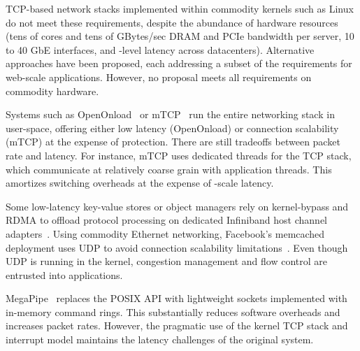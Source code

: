 TCP-based network stacks implemented within commodity kernels such as
Linux do not meet these requirements, despite the abundance of hardware
resources (tens of cores and tens of GBytes/sec DRAM and PCIe
bandwidth per server, 10 to 40 GbE interfaces, and \microsecond-level
latency across datacenters).
Alternative approaches have been proposed, each addressing a subset of
the requirements for web-scale applications. However, no
proposal meets all requirements on commodity hardware. 

 Systems such as
OpenOnload~\cite{openonload} or mTCP~\cite{jeong2014mtcp} run the
entire networking stack in user-space, offering either low latency
(OpenOnload) or connection scalability (mTCP) at the expense of
protection. There are still tradeoffs between packet rate and
latency. For instance, mTCP uses dedicated threads for the TCP
stack, which communicate at relatively coarse grain with application
threads. This amortizes switching overheads at the
expense of \microsecond-scale latency.

 Some low-latency key-value stores or object managers rely on
kernel-bypass and RDMA to offload protocol processing on dedicated
Infiniband host channel
adapters~\cite{DBLP:conf/sosp/OngaroRSOR11,Jose:2011:MDH,mitchell:rdma,dragojevic14farm}.  Using
commodity Ethernet networking, Facebook's memcached deployment uses
UDP to avoid connection scalability
limitations~\cite{nishtala2013scaling}. Even though UDP is running in
the kernel, congestion management and flow control are entrusted into
applications.

 MegaPipe~\cite{han2012megapipe}
replaces the POSIX API with lightweight sockets implemented with
in-memory command rings. This substantially reduces software overheads
and increases packet rates. However, the pragmatic use of the kernel
TCP stack and interrupt model maintains the latency challenges of the
original system.

